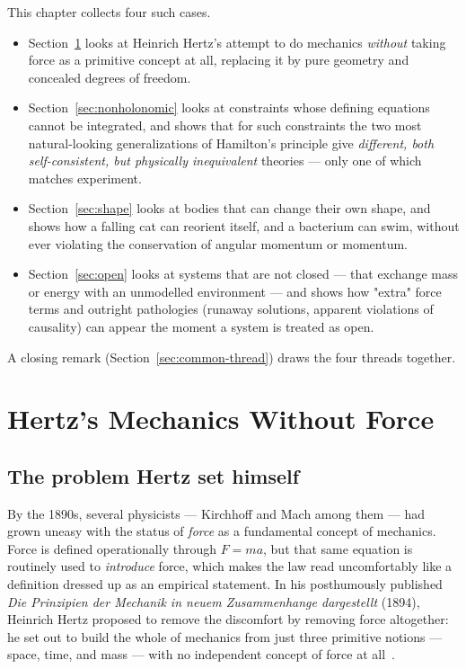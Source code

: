 This chapter collects four such cases.
\begin{itemize}
  \item Section~\ref{sec:hertz} looks at Heinrich Hertz's attempt to
  do mechanics \emph{without} taking force as a primitive concept at
  all, replacing it by pure geometry and concealed degrees of
  freedom.
  \item Section~\ref{sec:nonholonomic} looks at constraints whose
  defining equations cannot be integrated, and shows that for such
  constraints the two most natural-looking generalizations of
  Hamilton's principle give \emph{different, both self-consistent,
  but physically inequivalent} theories --- only one of which
  matches experiment.
  \item Section~\ref{sec:shape} looks at bodies that can change
  their own shape, and shows how a falling cat can reorient itself,
  and a bacterium can swim, without ever violating the conservation
  of angular momentum or momentum.
  \item Section~\ref{sec:open} looks at systems that are not closed
  --- that exchange mass or energy with an unmodelled environment
  --- and shows how "extra" force terms and outright pathologies
  (runaway solutions, apparent violations of causality) can appear
  the moment a system is treated as open.
\end{itemize}
A closing remark (Section~\ref{sec:common-thread}) draws the four
threads together.

\section{Hertz's Mechanics Without Force}
\label{sec:hertz}

\subsection{The problem Hertz set himself}

By the 1890s, several physicists --- Kirchhoff and Mach among them
--- had grown uneasy with the status of \emph{force} as a
fundamental concept of mechanics. Force is defined operationally
through $F=ma$, but that same equation is routinely used to
\emph{introduce} force, which makes the law read uncomfortably like
a definition dressed up as an empirical statement. In his
posthumously published \emph{Die Prinzipien der Mechanik in neuem
Zusammenhange dargestellt} (1894), Heinrich Hertz proposed to remove
the discomfort by removing force altogether: he set out to build the
whole of mechanics from just three primitive notions --- space,
time, and mass --- with no independent concept of force at
all~\cite{Hertz1894,Lutzen2005}.

